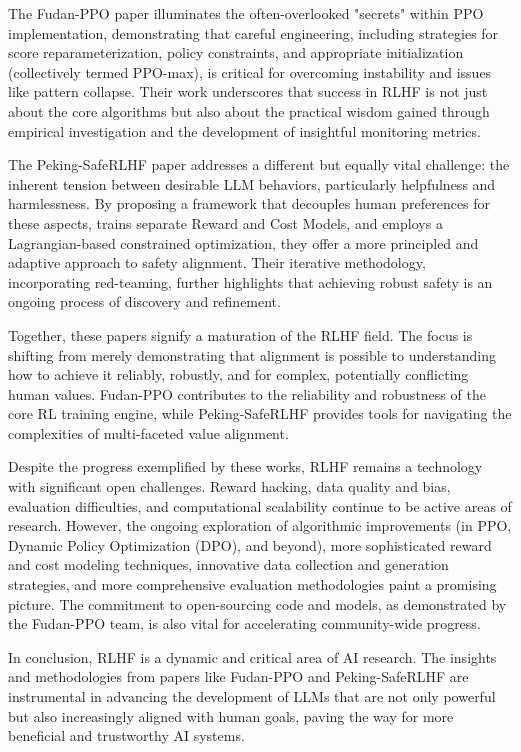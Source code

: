 \documentclass{article} %
\begin{document}
The Fudan-PPO paper illuminates the often-overlooked "secrets" within PPO implementation, demonstrating that careful engineering, including strategies for score reparameterization, policy constraints, and appropriate initialization (collectively termed PPO-max), is critical for overcoming instability and issues like pattern collapse. Their work underscores that success in RLHF is not just about the core algorithms but also about the practical wisdom gained through empirical investigation and the development of insightful monitoring metrics.

The Peking-SafeRLHF paper addresses a different but equally vital challenge: the inherent tension between desirable LLM behaviors, particularly helpfulness and harmlessness. By proposing a framework that decouples human preferences for these aspects, trains separate Reward and Cost Models, and employs a Lagrangian-based constrained optimization, they offer a more principled and adaptive approach to safety alignment. Their iterative methodology, incorporating red-teaming, further highlights that achieving robust safety is an ongoing process of discovery and refinement.

Together, these papers signify a maturation of the RLHF field. The focus is shifting from merely demonstrating that alignment is possible to understanding how to achieve it reliably, robustly, and for complex, potentially conflicting human values. Fudan-PPO contributes to the reliability and robustness of the core RL training engine, while Peking-SafeRLHF provides tools for navigating the complexities of multi-faceted value alignment.

Despite the progress exemplified by these works, RLHF remains a technology with significant open challenges. Reward hacking, data quality and bias, evaluation difficulties, and computational scalability continue to be active areas of research.\cite{Casper2023OpenProblems} However, the ongoing exploration of algorithmic improvements (in PPO, Dynamic Policy Optimization (DPO), and beyond), more sophisticated reward and cost modeling techniques, innovative data collection and generation strategies, and more comprehensive evaluation methodologies paint a promising picture. The commitment to open-sourcing code and models, as demonstrated by the Fudan-PPO team, is also vital for accelerating community-wide progress.  

In conclusion, RLHF is a dynamic and critical area of AI research. The insights and methodologies from papers like Fudan-PPO and Peking-SafeRLHF are instrumental in advancing the development of LLMs that are not only powerful but also increasingly aligned with human goals, paving the way for more beneficial and trustworthy AI systems.

\newpage


\end{document}
